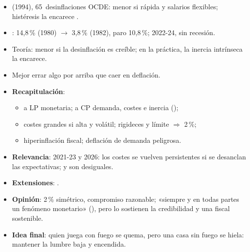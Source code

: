 \documentclass{article}
\begin{document}
\begin{columnas}
\begin{itemize}
  \begin{itemize}
  \item {} (1994), 65~desinflaciones OCDE: menor si rápida y salarios flexibles; histéresis la encarece .
  \item {}: 14,8\,\% (1980) $\to$ 3,8\,\% (1982), paro 10,8\,\%; 2022-24, sin recesión.
  \item Teoría: menor si la desinflación es creíble; en la práctica, la inercia intrínseca la encarece.
  \item Mejor errar algo por arriba que caer en deflación.
  \end{itemize}
\end{itemize}

\begin{itemize}
\item \textbf{Recapitulación}:
  \begin{itemize}
  \item a LP monetaria; a CP demanda, costes e inercia ();
  \item costes grandes si alta y volátil; rigideces y límite $\Rightarrow$ 2\,\%;
  \item hiperinflación fiscal; deflación de demanda peligrosa.
  \end{itemize}
\item \textbf{Relevancia}: 2021-23 y 2026: los costes se vuelven persistentes si se desanclan las expectativas; y son desiguales.
\item \textbf{Extensiones}:      .
\item \textbf{Opinión}: 2\,\% simétrico, compromiso razonable; «siempre y en todas partes un fenómeno monetario» (), pero lo sostienen la credibilidad y una fiscal sostenible.
\item \textbf{Idea final}: quien juega con fuego se quema, pero una casa sin fuego se hiela: mantener la lumbre baja y encendida.
\end{itemize}


\end{columnas}
\end{document}
